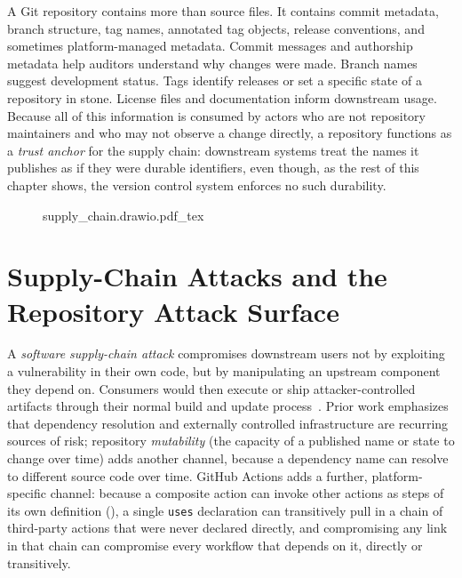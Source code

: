 A Git repository contains more than source files.
It contains commit metadata, branch structure, tag names, annotated tag objects, release conventions, and sometimes platform-managed metadata.
Commit messages and authorship metadata help auditors understand why changes were made.
Branch names suggest development status.
Tags identify releases or set a specific state of a repository in stone.
License files and documentation inform downstream usage.
Because all of this information is consumed by actors who are not repository maintainers and who may not observe a change directly, a repository functions as a \emph{trust anchor} for the supply chain: downstream systems treat the names it publishes as if they were durable identifiers, even though, as the rest of this chapter shows, the version control system enforces no such durability.

\begin{figure}[h]
\centering
\def\svgwidth{0.9\linewidth}
{supply_chain.drawio.pdf_tex}
\label{fig:bg-supply-chain-overview}
\end{figure}

\section{Supply-Chain Attacks and the Repository Attack Surface}
\label{sec:bg-supply-chain-attacks}

A \emph{software supply-chain attack} compromises downstream users not by exploiting a vulnerability in their own code, but by manipulating an upstream component they depend on.
Consumers would then execute or ship attacker-controlled artifacts through their normal build and update process~\cite{ladisa2023supplychain}.
Prior work emphasizes that dependency resolution and externally controlled infrastructure are recurring sources of risk; repository \emph{mutability} (the capacity of a published name or state to change over time) adds another channel, because a dependency name can resolve to different source code over time.
GitHub Actions adds a further, platform-specific channel: because a composite action can invoke other actions as steps of its own definition (), a single \texttt{uses} declaration can transitively pull in a chain of third-party actions that were never declared directly, and compromising any link in that chain can compromise every workflow that depends on it, directly or transitively.

